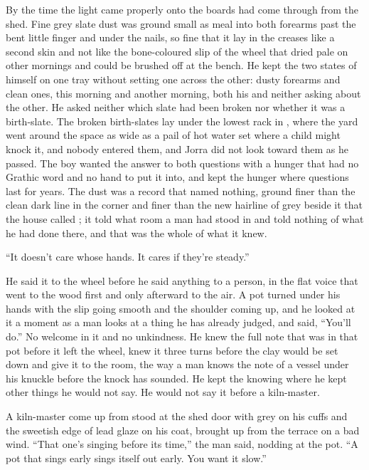 By the time the light came properly onto the boards  had come through from the shed. Fine grey slate dust was ground small as meal into both forearms past the bent little finger and under the nails, so fine that it lay in the creases like a second skin and not like the bone-coloured slip of the wheel that dried pale on other mornings and could be brushed off at the bench. He kept the two states of himself on one tray without setting one across the other: dusty forearms and clean ones, this morning and another morning, both his and neither asking about the other. He asked neither which slate had been broken nor whether it was a birth-slate. The broken birth-slates lay under the lowest rack in , where the yard went around the space as wide as a pail of hot water set where a child might knock it, and nobody entered them, and Jorra did not look toward them as he passed. The boy wanted the answer to both questions with a hunger that had no Grathic word and no hand to put it into, and kept the hunger where questions last for years. The dust was a record that named nothing, ground finer than the clean dark line in the corner and finer than the new hairline of grey beside it that the house called ; it told what room a man had stood in and told nothing of what he had done there, and that was the whole of what it knew.

“It doesn't care whose hands. It cares if they're steady.”

He said it to the wheel before he said anything to a person, in the flat voice that went to the wood first and only afterward to the air. A pot turned under his hands with the slip going smooth and the shoulder coming up, and he looked at it a moment as a man looks at a thing he has already judged, and said, “You'll do.” No welcome in it and no unkindness. He knew the full note that was in that pot before it left the wheel, knew it three turns before the clay would be set down and give it to the room, the way a man knows the note of a vessel under his knuckle before the knock has sounded. He kept the knowing where he kept other things he would not say. He would not say it before a kiln-master.

A kiln-master come up from  stood at the shed door with  grey on his cuffs and the sweetish edge of lead glaze on his coat, brought up from the terrace on a bad wind. “That one's singing before its time,” the man said, nodding at the pot. “A pot that sings early sings itself out early. You want it slow.”

